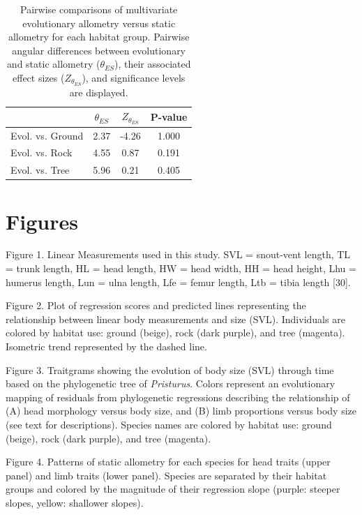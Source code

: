 \documentclass[
  11pt,
]{article}
\begin{document}
\begin{table}[H]

\caption{\label{tab:unnamed-chunk-3}Pairwise comparisons of multivariate evolutionary allometry versus static allometry for each habitat group. Pairwise angular differences between evolutionary and static allometry ($\theta_{ES}$), their associated effect sizes ($Z_{\theta_{ES}}$), and significance levels are displayed.}
\centering
\begin{tabular}[t]{lccc}
\toprule
  & $\theta_{ES}$ & $Z_{\theta_{ES}}$ & P-value\\
\midrule
Evol. vs. Ground & 2.37 & -4.26 & 1.000\\
Evol. vs. Rock & 4.55 & 0.87 & 0.191\\
Evol. vs. Tree & 5.96 & 0.21 & 0.405\\
\bottomrule
\end{tabular}
\end{table}

\newpage

\hypertarget{figures}{%
\section{Figures}\label{figures}}

Figure 1. Linear Measurements used in this study. SVL = snout-vent
length, TL = trunk length, HL = head length, HW = head width, HH = head
height, Lhu = humerus length, Lun = ulna length, Lfe = femur length, Ltb
= tibia length {[}30{]}.

Figure 2. Plot of regression scores and predicted lines representing the
relationship between linear body measurements and size (SVL).
Individuals are colored by habitat use: ground (beige), rock (dark
purple), and tree (magenta). Isometric trend represented by the dashed
line.

Figure 3. Traitgrams showing the evolution of body size (SVL) through
time based on the phylogenetic tree of \emph{Pristurus}. Colors
represent an evolutionary mapping of residuals from phylogenetic
regressions describing the relationship of (A) head morphology versus
body size, and (B) limb proportions versus body size (see text for
descriptions). Species names are colored by habitat use: ground (beige),
rock (dark purple), and tree (magenta).

Figure 4. Patterns of static allometry for each species for head traits
(upper panel) and limb traits (lower panel). Species are separated by
their habitat groups and colored by the magnitude of their regression
slope (purple: steeper slopes, yellow: shallower slopes).
\end{document}
